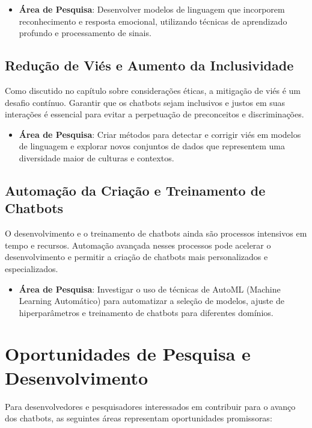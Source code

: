 \documentclass[14pt,a4paper,oneside]{book}
\begin{document}
\begin{itemize}
	\item \textbf{Área de Pesquisa}: Desenvolver modelos de linguagem que incorporem reconhecimento e resposta emocional, utilizando técnicas de aprendizado profundo e processamento de sinais.
\end{itemize}

\subsection{Redução de Viés e Aumento da Inclusividade}

Como discutido no capítulo sobre considerações éticas, a mitigação de viés é um desafio contínuo. Garantir que os chatbots sejam inclusivos e justos em suas interações é essencial para evitar a perpetuação de preconceitos e discriminações.

\begin{itemize}
	\item \textbf{Área de Pesquisa}: Criar métodos para detectar e corrigir viés em modelos de linguagem e explorar novos conjuntos de dados que representem uma diversidade maior de culturas e contextos.
\end{itemize}

\subsection{Automação da Criação e Treinamento de Chatbots}

O desenvolvimento e o treinamento de chatbots ainda são processos intensivos em tempo e recursos. Automação avançada nesses processos pode acelerar o desenvolvimento e permitir a criação de chatbots mais personalizados e especializados.

\begin{itemize}
	\item \textbf{Área de Pesquisa}: Investigar o uso de técnicas de AutoML (Machine Learning Automático) para automatizar a seleção de modelos, ajuste de hiperparâmetros e treinamento de chatbots para diferentes domínios.
\end{itemize}

\section{Oportunidades de Pesquisa e Desenvolvimento}

Para desenvolvedores e pesquisadores interessados em contribuir para o avanço dos chatbots, as seguintes áreas representam oportunidades promissoras:
\end{document}
